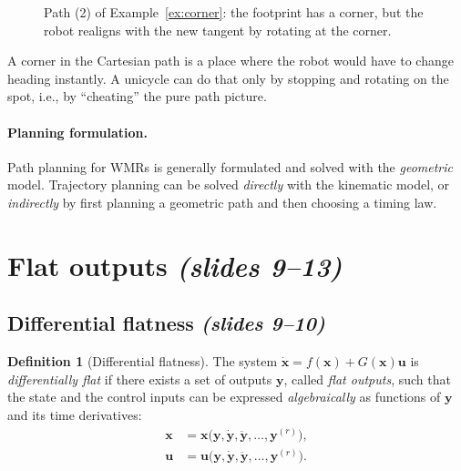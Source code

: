 \documentclass[11pt,a4paper]{article}
\theoremstyle{definition}
\newtheorem{definition}{Definition}[section]
\theoremstyle{plain}
\theoremstyle{remark}
\begin{document}
\begin{figure}[H]
\centering
{}
\caption{Path (2) of Example~\ref{ex:corner}: the footprint has a corner, but the robot realigns with the new tangent by rotating at the corner.}
\end{figure}
\begin{intuition}
A corner in the Cartesian path is a place where the robot would have to change heading instantly. A unicycle can do
that only by stopping and rotating on the spot, i.e., by ``cheating'' the pure path picture.
\end{intuition}

\paragraph{Planning formulation.} Path planning for WMRs is generally formulated and solved with the \emph{geometric}
model. Trajectory planning can be solved \emph{directly} with the kinematic model, or \emph{indirectly} by first planning a
geometric path and then choosing a timing law.

\section{Flat outputs \emph{(slides 9--13)}}

\subsection{Differential flatness \emph{(slides 9--10)}}

\begin{definition}[Differential flatness]
The system $\dot{\boldsymbol x}=f(\boldsymbol x)+G(\boldsymbol x)\boldsymbol u$ is \emph{differentially flat} if there exists a set of
outputs $\boldsymbol y$, called \emph{flat outputs}, such that the state and the control inputs can be expressed
\emph{algebraically} as functions of $\boldsymbol y$ and its time derivatives:
\begin{align}
\boldsymbol x&=\boldsymbol x\big(\boldsymbol y,\dot{\boldsymbol y},\ddot{\boldsymbol y},\dots,\boldsymbol y^{(r)}\big),\\
\boldsymbol u&=\boldsymbol u\big(\boldsymbol y,\dot{\boldsymbol y},\ddot{\boldsymbol y},\dots,\boldsymbol y^{(r)}\big).
\end{align}
\end{definition}
\end{document}
